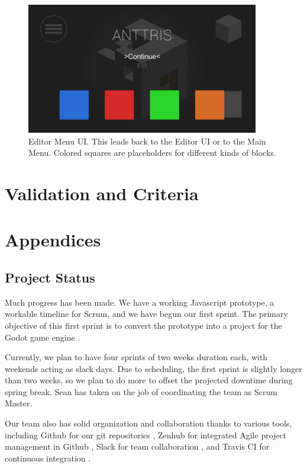 \documentclass[12pt]{article}
\begin{document}
    \begin{figure}[H]
        \centering
        \includegraphics[width=4in]{EditorMenuUI.png}
        \caption{Editor Menu UI. This leads back to the Editor UI or to the Main Menu. Colored squares are placeholders for different kinds of blocks. }
    \end{figure}

\section{Validation and Criteria}\label{validation-BC}

\section{Appendices}

\subsection{Project Status}\label{status-ST}

Much progress has been made. We have a working Javascript prototype, a
workable timeline for Scrum, and we have begun our first sprint. The
primary objective of this first sprint is to convert the prototype
into a project for the Godot game engine \cite{godot:gameengine}.

Currently, we plan to have four sprints of two weeks duration each,
with weekends acting as slack days. Due to scheduling, the first
sprint is slightly longer than two weeks, so we plan to do more to
offset the projected downtime during spring break. Sean has taken on the job of coordinating the team as Scrum Master.

Our team also has solid organization and collaboration thanks to various tools, including Github for our git repositories \cite{github:site}, Zenhub for integrated Agile project management in Github \cite{zenhub:site}, Slack for team collaboration \cite{slack:site}, and Travis CI for continuous integration \cite{travis:site}.
\end{document}
